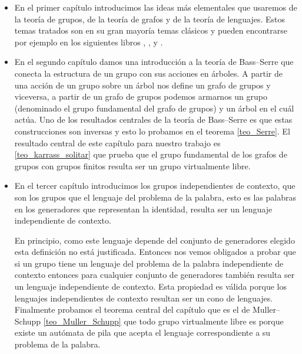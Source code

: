 \documentclass[tesis.tex]{subfiles}
\begin{document}
	\begin{itemize}
		\item 
			En el primer capítulo introducimos las ideas más elementales que usaremos de la teoría de grupos, de la teoría de grafos y de la teoría de lenguajes.
			Estos temas tratados son en su gran mayoría temas clásicos y pueden encontrarse por ejemplo en los siguientes libros \cite{lyndon1977combinatorial}, \cite{diestel2005graph}, \cite{gallier2022mathematical} y \cite{hopcraft-ullman}.
		
		\item 
			En el segundo capítulo damos una introducción a la teoría de Bass--Serre que conecta la estructura de un grupo con sus acciones en árboles.
			A partir de una acción de un grupo sobre un árbol nos define un grafo de grupos y viceversa, a partir de un grafo de grupos podemos armarnos un grupo (denominado el grupo fundamental del grafo de grupos) y un árbol en el cuál actúa.
			Uno de los resultados centrales de la teoría de Bass--Serre es que estas construcciones son inversas y esto lo probamos en el teorema \ref{teo_Serre}.
			El resultado central de este capítulo para nuestro trabajo es \ref{teo_karrass_solitar} que prueba que el grupo fundamental de los grafos de grupos con grupos finitos resulta ser un grupo virtualmente libre.

		\item 
			En el tercer capítulo introducimos los grupos independientes de contexto, que son los grupos que el lenguaje del problema de la palabra, esto es las palabras en los generadores que representan la identidad, resulta ser un lenguaje independiente de contexto.
			 
			En principio, como este lenguaje depende del conjunto de generadores elegido esta definición no está justificada.
			Entonces nos vemos obligados a probar que si un grupo tiene un lenguaje del problema de la palabra independiente de contexto entonces para cualquier conjunto de generadores también resulta ser un lenguaje independiente de contexto.
			Esta propiedad es válida porque los lenguajes independientes de contexto resultan ser un cono de lenguajes.
			Finalmente probamos el teorema central del capítulo que es el de Muller--Schupp \ref{teo_Muller_Schupp} que todo grupo virtualmente libre es \ic porque existe un autómata de pila que acepta el lenguaje correspondiente a su problema de la palabra. 
			
			
		

\end{itemize}
\end{document}
